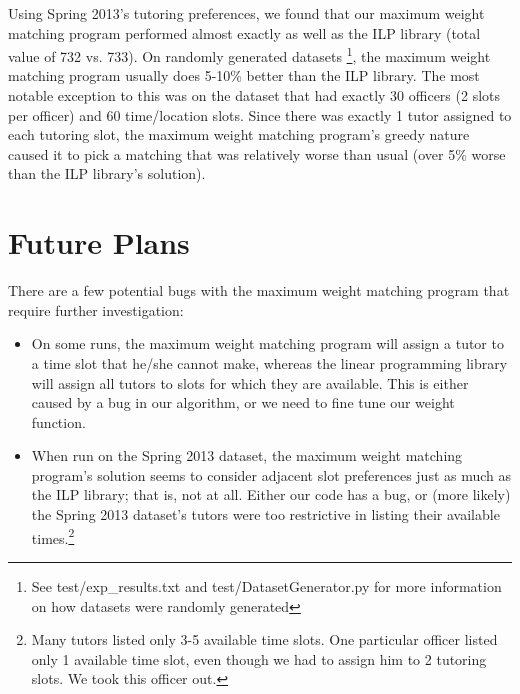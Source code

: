 \documentclass{vldb}
\begin{document}
Using Spring 2013's tutoring preferences, we found that our maximum weight matching program performed almost exactly as well as the ILP library (total value of 732 vs. 733). On randomly generated datasets \footnote{See test/exp\_results.txt and test/DatasetGenerator.py for more information on how datasets were randomly generated}, the maximum weight matching program usually does 5-10\% better than the ILP library. The most notable exception to this was on the dataset that had exactly 30 officers (2 slots per officer) and 60 time/location slots. Since there was exactly 1 tutor assigned to each tutoring slot, the maximum weight matching program's greedy nature caused it to pick a matching that was relatively worse than usual (over 5\% worse than the ILP library's solution).

\section{Future Plans}
There are a few potential bugs with the maximum weight matching program that require further investigation:
\begin{itemize}
\item On some runs, the maximum weight matching program will assign a tutor to a time slot that he/she cannot make, whereas the linear programming library will assign all tutors to slots for which they are available. This is either caused by a bug in our algorithm, or we need to fine tune our weight function.
\item When run on the Spring 2013 dataset, the maximum weight matching program's solution seems to consider adjacent slot preferences just as much as the ILP library; that is, not at all. Either our code has a bug, or (more likely) the Spring 2013 dataset's tutors were too restrictive in listing their available times.\footnote{Many tutors listed only 3-5 available time slots. One particular officer listed only 1 available time slot, even though we had to assign him to 2 tutoring slots. We took this officer out.}
\end{itemize}
\end{document}
